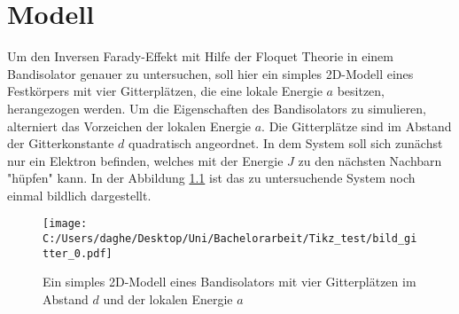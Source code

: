 \chapter{Modell}
Um den Inversen Farady-Effekt mit Hilfe der Floquet Theorie in
einem Bandisolator genauer zu untersuchen, soll hier ein simples 2D-Modell
eines Festkörpers mit vier Gitterplätzen, die eine lokale Energie $a$ besitzen, herangezogen werden.
Um die Eigenschaften des Bandisolators zu simulieren, alterniert
das Vorzeichen der lokalen Energie $a$.
Die Gitterplätze sind im Abstand der Gitterkonstante $d$ quadratisch angeordnet.
In dem System soll sich zunächst nur ein Elektron befinden, welches mit der Energie
$J$ zu den nächsten Nachbarn "hüpfen" kann.
In der Abbildung \ref{fig:system}
ist das zu untersuchende System noch einmal bildlich dargestellt.

\begin{figure}
   \centering
   \texttt{[image: C:/Users/daghe/Desktop/Uni/Bachelorarbeit/Tikz\_test/bild\_gitter\_0.pdf]}
   \caption{Ein simples 2D-Modell eines Bandisolators mit vier Gitterplätzen im Abstand $d$ und der lokalen Energie $a$}
   \label{fig:system}
\end{figure}




